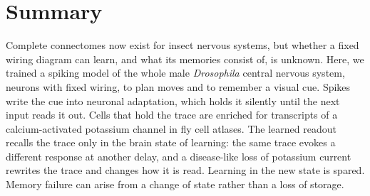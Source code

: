 \section{Summary}
\noindent Complete connectomes now exist for insect nervous systems, but whether a fixed wiring diagram can learn, and what
its memories consist of, is unknown. Here, we trained a spiking model of the whole male \textit{Drosophila} central nervous
system,  neurons with fixed wiring, to plan moves and to remember a visual cue. Spikes write the cue into neuronal
adaptation, which holds it silently until the next input reads it out. Cells that hold the trace are enriched for transcripts
of a calcium-activated potassium channel in fly cell atlases. The learned readout recalls the trace only in the brain state of
learning: the same trace evokes a different response at another delay, and a disease-like loss of potassium current rewrites
the trace and changes how it is read. Learning in the new state is spared. Memory failure can arise from a change of state
rather than a loss of storage.
